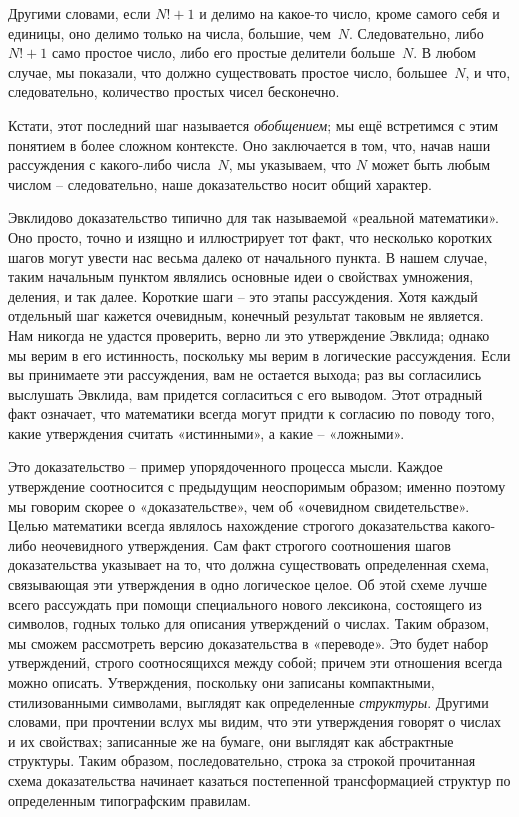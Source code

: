 \documentclass[../main.tex]{subfiles}
\begin{document}
Другими словами, если $N! + 1$ и делимо на какое-то число, кроме самого себя и единицы, оно делимо только на числа, большие, чем~$N$. Следовательно, либо $N! + 1$ само простое число, либо его простые делители больше~$N$. В любом случае, мы показали, что должно существовать простое число, большее~$N$, и что, следовательно, количество простых чисел бесконечно.

Кстати, этот последний шаг называется \emph{обобщением}; мы ещё встретимся с этим понятием в более сложном контексте. Оно заключается в том, что, начав наши рассуждения с какого-либо числа~$N$, мы указываем, что $N$ может быть любым числом \--- следовательно, наше доказательство носит общий характер.

Эвклидово доказательство типично для так называемой «реальной математики». Оно просто, точно и изящно и иллюстрирует тот факт, что несколько коротких шагов могут увести нас весьма далеко от начального пункта. В нашем случае, таким начальным пунктом являлись основные идеи о свойствах умножения, деления, и так далее. Короткие шаги \--- это этапы рассуждения. Хотя каждый отдельный шаг кажется очевидным, конечный результат таковым не является. Нам никогда не удастся проверить, верно ли это утверждение Эвклида; однако мы верим в его истинность, поскольку мы верим в логические рассуждения. Если вы принимаете эти рассуждения, вам не остается выхода; раз вы согласились выслушать Эвклида, вам придется согласиться с его выводом. Этот отрадный факт означает, что математики всегда могут придти к согласию по поводу того, какие утверждения считать «истинными», а какие \--- «ложными».

Это доказательство \--- пример упорядоченного процесса мысли. Каждое утверждение соотносится с предыдущим неоспоримым образом; именно поэтому мы говорим скорее о «доказательстве», чем об «очевидном свидетельстве». Целью математики всегда являлось нахождение строгого доказательства какого-либо неочевидного утверждения. Сам факт строгого соотношения шагов доказательства указывает на то, что должна существовать определенная схема, связывающая эти утверждения в одно логическое целое. Об этой схеме лучше всего рассуждать при помощи специального нового лексикона, состоящего из символов, годных только для описания утверждений о числах. Таким образом, мы сможем рассмотреть версию доказательства в «переводе». Это будет набор утверждений, строго соотносящихся между собой; причем эти отношения всегда можно описать. Утверждения, поскольку они записаны компактными, стилизованными символами, выглядят как определенные \emph{структуры}. Другими словами, при прочтении вслух мы видим, что эти утверждения говорят о числах и их свойствах; записанные же на бумаге, они выглядят как абстрактные структуры. Таким образом, последовательно, строка за строкой прочитанная схема доказательства начинает казаться постепенной трансформацией структур по определенным типографским правилам.
\end{document}
